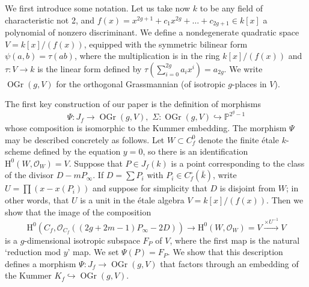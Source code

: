 \documentclass{article} %
\numberwithin{equation}{section}
\renewcommand{\P}{\mathbb{P}}
\renewcommand{\O}{\mathcal{O}}
\newcommand{\HH}{\mathrm{H}}
\DeclareMathOperator{\OGr}{OGr}
\begin{document}
We first introduce some notation. Let us take now $k$ to be any field of characteristic not 2, and $f(x) = x^{2g+1} + c_1 x^{2g} + \dots + c_{2g+1} \in k[x]$ a polynomial of nonzero discriminant. We define a nondegenerate quadratic space $V = k[x] / (f(x))$, equipped with the symmetric bilinear form $\psi(a, b) = \tau(ab)$, where the multiplication is in the ring $k[x] / (f(x))$ and $\tau : V \to k$ is the linear form defined by $\tau( \sum_{i=0}^{2g} a_i x^i) = a_{2g}$. We write $\OGr(g, V)$ for the orthogonal Grassmannian (of isotropic $g$-places in $V$). 

The first key construction of our paper is the definition of morphisms
\[
\Psi : J_f \rightarrow \OGr(g,V), \,\, \Sigma : \OGr(g, V) \hookrightarrow \P^{2^g-1}
\]
whose composition is isomorphic to the Kummer embedding.
The morphism $\Psi$ may be described concretely as follows. Let $W \subset C_f^0$ denote the finite \'etale $k$-scheme defined by the equation $y = 0$, so there is an identification $\HH^0(W, \O_W) = V$.  
Suppose that $P \in J_f(k)$ is a point corresponding to the class of the divisor $D-mP_{\infty}$. 
If $D = \sum P_i$ with $P_i \in C_f^{\circ}(\bar{k})$, write $U = \prod (x- x(P_i))$ and suppose for simplicity that $D$ is disjoint from $W$; in other words, that $U$ is a unit in the \'etale algebra $V=k[x]/(f(x))$.
Then we show that the image of the composition
\[
\HH^0(C_f, \O_{C_f}((2g+2m-1)P_{\infty}-2D)) \rightarrow \HH^0(W, \O_W) = V\xrightarrow{\times U^{-1}} V
\]
is a $g$-dimensional isotropic subspace $F_P$ of $V$, where the first map is the natural `reduction mod $y$' map.
We set $\Psi(P) = F_P$.
We show that this description defines a morphism $\Psi\colon J_f\rightarrow \OGr(g,V)$ that factors through an embedding of the Kummer $K_f\hookrightarrow \OGr(g,V)$.
\end{document}
